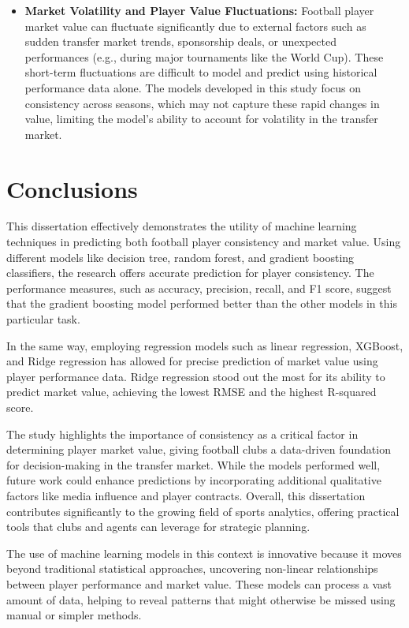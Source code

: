 \documentclass[12pt, a4paper,oneside]{book}
\numberwithin{equation}{section}
\begin{document}
\begin{itemize}
    \item \textbf{Market Volatility and Player Value Fluctuations:} Football player market value can fluctuate significantly due to external factors such as sudden transfer market trends, sponsorship deals, or unexpected performances (e.g., during major tournaments like the World Cup). These short-term fluctuations are difficult to model and predict using historical performance data alone. The models developed in this study focus on consistency across seasons, which may not capture these rapid changes in value, limiting the model’s ability to account for volatility in the transfer market.
\end{itemize}

\chapter{Conclusions}\label{ch:concl}
This dissertation effectively demonstrates the utility of machine learning techniques in predicting both football player consistency and market value. Using different models like decision tree, random forest, and gradient boosting classifiers, the research offers accurate prediction for player consistency. The performance measures, such as accuracy, precision, recall, and F1 score, suggest that the gradient boosting model performed better than the other models in this particular task.

In the same way, employing regression models such as linear regression, XGBoost, and Ridge regression has allowed for precise prediction of market value using player performance data. Ridge regression stood out the most for its ability to predict market value, achieving the lowest RMSE and the highest R-squared score.

The study highlights the importance of consistency as a critical factor in determining player market value, giving football clubs a data-driven foundation for decision-making in the transfer market. While the models performed well, future work could enhance predictions by incorporating additional qualitative factors like media influence and player contracts. Overall, this dissertation contributes significantly to the growing field of sports analytics, offering practical tools that clubs and agents can leverage for strategic planning.

The use of machine learning models in this context is innovative because it moves beyond traditional statistical approaches, uncovering non-linear relationships between player performance and market value. These models can process a vast amount of data, helping to reveal patterns that might otherwise be missed using manual or simpler methods.
\end{document}
